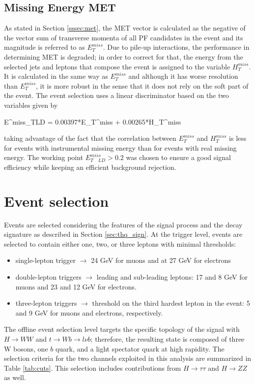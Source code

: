 \subsection{Missing Energy MET}

As stated in Section \ref{sssec:met}, the MET vector is calculated as the negative of the vector sum of transverse momenta of all PF candidates in the event and its magnitude is referred to as $E_T^{miss}$. Due to pile-up interactions, the performance in determining MET is degraded; in order to correct for that, the energy from the selected jets and leptons that compose the event is assigned to the variable $H_T^{miss}$. It is calculated in the same way as  $E_T^{miss}$ and although it has worse resolution than $E_T^{miss}$, it is more robust in the sense that it does not rely on the soft part of the event. The event selection uses a linear discriminator based on the two variables given by 

\beqn
E^{miss}_{T\quad LD} = 0.00397*E_T^{miss} + 0.00265*H_T^{miss}
\eeqn

\noindent taking advantage of the fact that the correlation between $E_T^{miss}$ and  $H_T^{miss}$ is less for events with instrumental missing energy than for events with real missing energy. The working point $E^{miss}_{T\quad LD} > 0.2$ was chosen to ensure a good signal efficiency while keeping an efficient background rejection.

\section{Event selection}

Events are selected considering the features of the signal process and the decay signature as described in Section \ref{sec:thq_sign}. At the trigger level, events are selected to contain either one, two, or three leptons with minimal \pt thresholds:
\begin{itemize}
\item single-lepton trigger $\to$ 24 GeV for muons and at 27 GeV for electrons
\item double-lepton triggers $\to$ leading and sub-leading leptons: 17 and 8 GeV for muons and 23 and 12 GeV for electrons.
\item three-lepton triggers $\to$ threshold on the third hardest lepton in the event: 5 and 9 GeV for muons and electrons, respectively.
\end{itemize}

The offline event selection level targets the specific topology of the \tHq signal with $H\to WW$ and $t \to Wb \to l\nu b$; therefore, the resulting state is composed of three W bosons, one $b$ quark, and a light spectator quark at high rapidity. The selection criteria for the two channels exploited in this analysis are summarized in Table \ref{tab:cuts}. This selection includes contributions from $H \to \tau\tau$ and $H\to ZZ$ as well.

